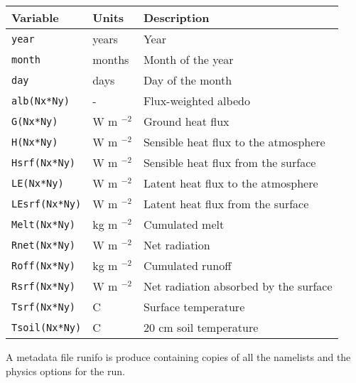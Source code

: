 \documentclass{article}
\begin{document}
\begin{tabular}{|l|l|l|}
\hline
Variable & Units & Description \\
\hline
{\tt year}         & years        & Year                                 \\
{\tt month}        & months       & Month of the year                    \\
{\tt day}          & days         & Day of the month                     \\
{\tt alb(Nx*Ny)}   & -            & Flux-weighted albedo                 \\
{\tt G(Nx*Ny)}     & W m $^{-2}$  & Ground heat flux                     \\
{\tt H(Nx*Ny)}     & W m $^{-2}$  & Sensible heat flux to the atmosphere \\
{\tt Hsrf(Nx*Ny)}  & W m $^{-2}$  & Sensible heat flux from the surface  \\
{\tt LE(Nx*Ny)}    & W m $^{-2}$  & Latent heat flux to the atmosphere   \\
{\tt LEsrf(Nx*Ny)} & W m $^{-2}$  & Latent heat flux from the surface    \\
{\tt Melt(Nx*Ny)}  & kg m $^{-2}$ & Cumulated melt                       \\
{\tt Rnet(Nx*Ny)}  & W m $^{-2}$  & Net radiation                        \\
{\tt Roff(Nx*Ny)}  & kg m $^{-2}$ & Cumulated runoff                     \\
{\tt Rsrf(Nx*Ny)}  & W m $^{-2}$  & Net radiation absorbed by the surface\\
{\tt Tsrf(Nx*Ny)}  & C            & Surface temperature                  \\
{\tt Tsoil(Nx*Ny)} & C            & 20 cm soil temperature               \\
\hline 
\end{tabular}

A metadata file runifo is produce containing copies of all the namelists and the physics options for the run.
 



\end{document}
